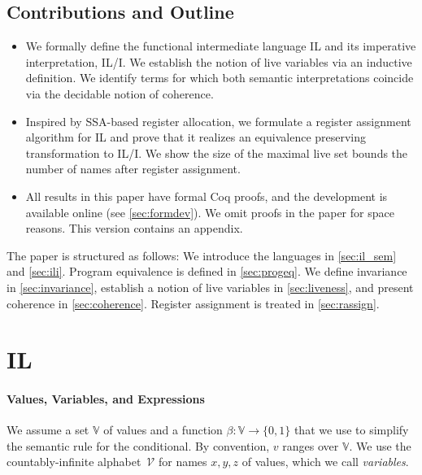 \documentclass[openright,a4paper,11pt]{scrartcl}
\newcommand{\set}[1]{\ensuremath{\{#1\}}}
\newcommand{\Var}{\ensuremath{\mathcal{V}}}
\newcommand{\Val}{\ensuremath{\mathbb{V}}}
\newcommand{\valtobool}{\ensuremath{\beta}}
\newcommand\restr[2]{{  \left.\kern-\nulldelimiterspace   #1   \vphantom{\big|}   \right|_{#2}   }}
\newcommand{\myref}[1]{\autoref{#1}}
\theoremstyle{plain}
\theoremstyle{plain}
\theoremstyle{plain}
\theoremstyle{plain}
\theoremstyle{nonumberplain}
\begin{document}
 \subsection{Contributions and Outline}
\begin{itemize}
  \item We formally define the functional intermediate language IL and its imperative interpretation, IL/I.
    We establish the notion of live variables via an inductive definition.
    We identify terms for which both semantic interpretations coincide via the decidable notion of coherence.
  \item Inspired by SSA-based register allocation, we formulate a register assignment algorithm for IL and prove that it realizes an equivalence preserving transformation to IL/I. We show the size of the maximal live set bounds the number of names after register assignment.
    \item All results in this paper have formal Coq proofs, and the development is available online (see \myref{sec:formdev}).
We omit proofs in the paper for space reasons.
This version contains an appendix.
\end{itemize}
The paper is structured as follows:
We introduce the languages in \myref{sec:il_sem} and \myref{sec:ili}.
Program equivalence is defined in \myref{sec:progeq}.
We define invariance in \myref{sec:invariance}, establish a notion of live variables in \myref{sec:liveness}, and present coherence in \myref{sec:coherence}.
Register assignment is treated in \myref{sec:rassign}.

 \newcommand{\res}{\mathit{res}}
 \renewcommand\restr[2]{{  \left.\kern-\nulldelimiterspace   #1   \vphantom{\big|}   \right|_{#2}   }}

\newcommand{\extevt}{\ensuremath{\alpha}}
\newcommand{\evt}{\ensuremath{\phi}}
\newcommand{\configs}{\ensuremath{\Sigma}}
\newcommand{\config}{\ensuremath{\sigma}}
\newcommand{\closures}{\ensuremath{\mathcal{C}}}

\section{IL}
\label{sec:il_sem}
\paragraph{Values, Variables, and Expressions}
We assume a set $\Val$ of values and a function
$\valtobool:\Val\to\set{0,1}$ that we use to simplify the semantic rule for the conditional.
By convention, $v$ ranges over $\Val$.
We use the countably-infinite alphabet~$\Var$ for names $x,y,z$ of values, which we call \emph{variables}.
\end{document}
